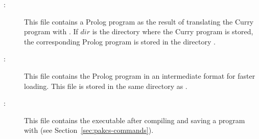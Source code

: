 \begin{description}
\item[:] This file contains a Prolog program
as the result of translating the Curry program with \CYS.
If $dir$ is the directory where the Curry program is stored,
the corresponding Prolog program is stored in the directory
.

\item[:] This file contains the Prolog program
 in an intermediate format for faster loading.
This file is stored in the same directory as .

\item[:] This file contains the executable
after compiling and saving a program with \CYS
(see Section~\ref{sec:pakcs-commands}).

\end{description}


